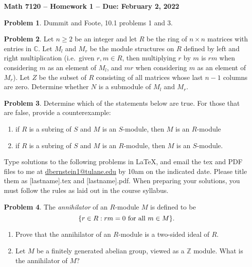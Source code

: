 \documentclass[letterpaper,11pt]{amsart}
\theoremstyle{plain}
\theoremstyle{definition}
\newtheorem{pr}{Problem}
\theoremstyle{remark}
\begin{document}
\Large

\begin{center}
{\bf Math 7120 -- Homework  1 --  Due:  February 2, 2022}
\end{center}

\normalsize



\medskip


\begin{pr}
    Dummit and Foote, 10.1 problems 1 and 3.
\end{pr}


\begin{pr}
    Let $n \ge 2$ be an integer and let $R$ be the ring of $n\times n$ matrices with entries in $\mathbb{C}$.
    Let $M_l$ and $M_r$ be the module structures on $R$ defined by left and right multiplication (i.e.~given $r,m \in R$, then multiplying $r$ by $m$ is $rm$ when considering $m$ as an element of $M_l$, and $mr$ when considering $m$ as an element of $M_r$).
    Let $Z$ be the subset of $R$ consisting of all matrices whose last $n-1$ columns are zero.
    Determine whether $N$ is a submodule of $M_l$ and $M_r$.
\end{pr}

\begin{pr}
    Determine which of the statements below are true. For those that are false, provide a counterexample:
    \begin{enumerate}
        \item if $R$ is a subring of $S$ and $M$ is an $S$-module, then $M$ is an $R$-module
        \item if $R$ is a subring of $S$ and $M$ is an $R$-module, then $M$ is an $S$-module.
    \end{enumerate}
\end{pr}

\bigskip

Type solutions to the following problems in \LaTeX, and email the tex and PDF files to me at \url{dbernstein1@tulane.edu} by 10am on the indicated date.
Please title them as [lastname].tex and [lastname].pdf.
When preparing your solutions, you must follow the rules as laid out in the course syllabus.

\vspace{.5cm}


\begin{pr}
    The \emph{annihilator} of an $R$-module $M$ is defined to be
    \[
        \{r \in R : rm = 0 \ {\rm for \ all} \ m \in M\}.
    \]
    \begin{enumerate}
        \item Prove that the annihilator of an $R$-module is a two-sided ideal of $R$.
        \item Let $M$ be a finitely generated abelian group, viewed as a $\mathbb{Z}$ module. What is the annihilator of $M$?
    \end{enumerate}
\end{pr}
\end{document}
